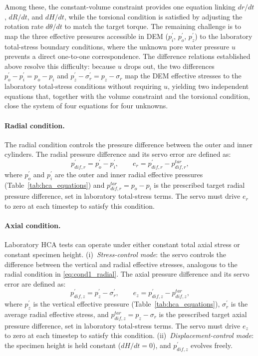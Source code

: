 Among these, the constant-volume constraint provides one equation linking $dr/dt$, $dR/dt$, and $dH/dt$, while the torsional condition is satisfied by adjusting the rotation rate $d\theta/dt$ to match the target torque. The remaining challenge is to map the three effective pressures accessible in DEM ($p_i^{\prime}$, $p_o^{\prime}$, $p_z^{\prime}$) to the laboratory total-stress boundary conditions, where the unknown pore water pressure $u$ prevents a direct one-to-one correspondence. The difference relations established above resolve this difficulty: because $u$ drops out, the two differences $p_o^{\prime}-p_i^{\prime}=p_o-p_i$ and $p_z^{\prime}-\sigma_r^{\prime}=p_z-\sigma_r$ map the DEM effective stresses to the laboratory total-stress conditions without requiring $u$, yielding two independent equations that, together with the volume constraint and the torsional condition, close the system of four equations for four unknowns.

\paragraph{Radial condition.}
The radial condition controls the pressure difference between the outer and inner cylinders. The radial pressure difference and its servo error are defined as:
\begin{equation}
p_{dif,r}^{\prime} = p_o^{\prime} - p_i^{\prime}, \qquad e_r = p_{dif,r}^{\prime} - p_{dif,r}^{tar},
\label{eq:cond1_radial}
\end{equation}
where $p_o^{\prime}$ and $p_i^{\prime}$ are the outer and inner radial effective pressures (Table~\ref{tab:hca_equations}) and $p_{dif,r}^{tar}=p_o-p_i$ is the prescribed target radial pressure difference, set in laboratory total-stress terms. The servo must drive $e_r$ to zero at each timestep to satisfy this condition.

\paragraph{Axial condition.}
Laboratory HCA tests can operate under either constant total axial stress or constant specimen height.
(i)~\emph{Stress-control mode}: the servo controls the difference between the vertical and radial effective stresses, analogous to the radial condition in \cref{eq:cond1_radial}. The axial pressure difference and its servo error are defined as:
\begin{equation}
p_{dif,z}^{\prime} = p_z^{\prime} - \sigma_r^{\prime}, \qquad e_z = p_{dif,z}^{\prime} - p_{dif,z}^{tar},
\label{eq:cond2_axial}
\end{equation}
where $p_z^{\prime}$ is the vertical effective pressure (Table~\ref{tab:hca_equations}), $\sigma_r^{\prime}$ is the average radial effective stress, and $p_{dif,z}^{tar}=p_z-\sigma_r$ is the prescribed target axial pressure difference, set in laboratory total-stress terms. The servo must drive $e_z$ to zero at each timestep to satisfy this condition.
(ii)~\emph{Displacement-control mode}: the specimen height is held constant ($dH/dt=0$), and $p_{dif,z}^{\prime}$ evolves freely.

